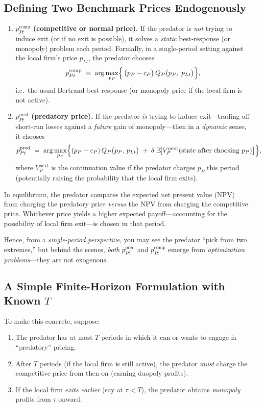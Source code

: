 \documentclass[12pt,oneside]{article}
\theoremstyle{definition}
\theoremstyle{remark}
\begin{document}
\subsection{Defining Two Benchmark Prices Endogenously}

\begin{enumerate}
\item \textbf{$p_{Pt}^{\text{comp}}$ (competitive or normal price).} 
If the predator is \emph{not} trying to induce exit (or if no exit is possible), it solves a \emph{static} best-response (or monopoly) problem each period. Formally, in a single-period setting against the local firm's price $p_{Lt}$, the predator chooses
\[
p_{Pt}^{\text{comp}}
\;=\;
\arg\max_{p_P}
\Bigl\{\,
\bigl(p_P - c_P\bigr)\,
Q_P\bigl(p_P,\;p_{Lt}\bigr)
\Bigr\},
\]
i.e.\ the usual Bertrand best-response (or monopoly price if the local firm is not active).

\item \textbf{$p_{Pt}^{\text{pred}}$ (predatory price).}
If the predator \emph{is} trying to induce exit---trading off short-run losses against a \emph{future} gain of monopoly---then in a \emph{dynamic} sense, it chooses
\[
p_{Pt}^{\text{pred}}
\;=\;
\arg\max_{p_P}
\Bigl\{
(p_P - c_P)\,Q_P\bigl(p_P,\,p_{Lt}\bigr)
\;+\;
\delta \;\mathbb{E}\!\bigl[V_P^{\text{next}}(\text{state after choosing }p_P)\bigr]
\Bigr\},
\]
where $V_P^{\text{next}}$ is the continuation value if the predator charges $p_P$ this period (potentially raising the probability that the local firm exits). 

\end{enumerate}

\noindent
In equilibrium, the predator compares the expected net present value (NPV) from charging the predatory price \emph{versus} the NPV from charging the competitive price. Whichever price yields a higher expected payoff---accounting for the possibility of local firm exit---is chosen in that period.

Hence, from a \emph{single-period perspective}, you may see the predator ``pick from two extremes,'' but behind the scenes, \emph{both} $p_{Pt}^{\text{pred}}$ and $p_{Pt}^{\text{comp}}$ emerge from \emph{optimization problems}---they are not exogenous.

\subsection{A Simple Finite-Horizon Formulation with Known $T$}

To make this concrete, suppose:
\begin{enumerate}
\item The predator has at most $T$ periods in which it can or wants to engage in ``predatory'' pricing.
\item After $T$ periods (if the local firm is still active), the predator \emph{must} charge the competitive price from then on (earning duopoly profits).
\item If the local firm \emph{exits earlier} (say at $\tau < T$), the predator obtains \emph{monopoly} profits from $\tau$ onward.
\end{enumerate}
\end{document}
